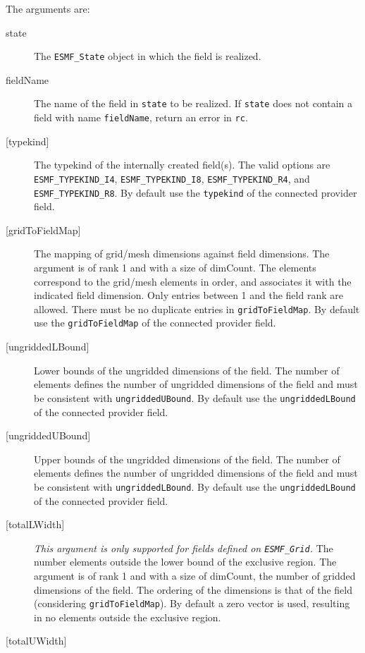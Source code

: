      The arguments are:
     \begin{description}
     \item[state]
       The {\tt ESMF\_State} object in which the field is realized.
     \item[fieldName]
       The name of the field in {\tt state} to be realized. If {\tt state} does
       not contain a field with name {\tt fieldName}, return an error in 
       {\tt rc}.
     \item[{[typekind]}]
       The typekind of the internally created field(s). The valid options are
       {\tt ESMF\_TYPEKIND\_I4}, {\tt ESMF\_TYPEKIND\_I8},
       {\tt ESMF\_TYPEKIND\_R4}, and {\tt ESMF\_TYPEKIND\_R8}.
       By default use the {\tt typekind} of the connected provider field.
     \item[{[gridToFieldMap]}]
       The mapping of grid/mesh dimensions against field dimensions. The argument
       is of rank 1 and with a size of dimCount. The elements correspond to the
       grid/mesh elements in order, and associates it with the indicated 
       field dimension. Only entries between 1 and the field rank are allowed.
       There must be no duplicate entries in {\tt gridToFieldMap}.
       By default use the {\tt gridToFieldMap} of the connected provider field.
     \item[{[ungriddedLBound]}]
       Lower bounds of the ungridded dimensions of the field. The number of
       elements defines the number of ungridded dimensions of the field and 
       must be consistent with {\tt ungriddedUBound}.
       By default use the {\tt ungriddedLBound} of the connected provider field.
     \item[{[ungriddedUBound]}]
       Upper bounds of the ungridded dimensions of the field. The number of
       elements defines the number of ungridded dimensions of the field and 
       must be consistent with {\tt ungriddedLBound}.
       By default use the {\tt ungriddedLBound} of the connected provider field.
     \item[{[totalLWidth]}]
       {\em This argument is only supported for fields defined on
       {\tt ESMF\_Grid}.}
       The number elements outside the lower bound of the exclusive region.
       The argument is of rank 1 and with a size of dimCount, the number of
       gridded dimensions of the field. The ordering of the dimensions is that
       of the field (considering {\tt gridToFieldMap}).
       By default a zero vector is used, resulting in no elements outside the
       exclusive region.
     \item[{[totalUWidth]}]

\end{description}
